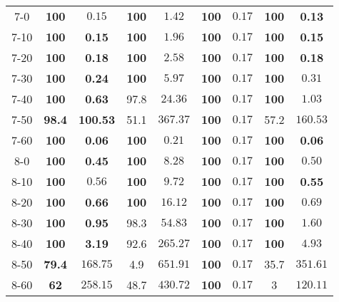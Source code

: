 \documentclass{article}
\begin{document}
\begin{table}[t]
{{\begin{tabular}{c|cc|cc|cc|cc}
            7-0  &  \textbf{100} & $0.15$  &  \textbf{100} & $1.42$  &  \textbf{100} & $0.17$  &  \textbf{100} & \textbf{0.13} \\
            7-10  &  \textbf{100} & \textbf{0.15}  &  \textbf{100} & $1.96$  &  \textbf{100} & $0.17$  &  \textbf{100} & \textbf{0.15} \\
            7-20  &  \textbf{100} & \textbf{0.18}  &  \textbf{100} & $2.58$  &  \textbf{100} & $0.17$  &  \textbf{100} & \textbf{0.18} \\
            7-30  &  \textbf{100} & \textbf{0.24}  &  \textbf{100} & $5.97$  &  \textbf{100} & $0.17$  &  \textbf{100} & $0.31$ \\
            7-40  &  \textbf{100} & \textbf{0.63}  &  97.8 & $24.36$  &  \textbf{100} & $0.17$  &  \textbf{100} & $1.03$ \\
            7-50  &  \textbf{98.4} & \textbf{100.53}  &  51.1 & $367.37$  &  \textbf{100} & $0.17$  &  57.2 & $160.53$ \\
            7-60  &  \textbf{100} & \textbf{0.06}  &  \textbf{100} & $0.21$  &  \textbf{100} & $0.17$  &  \textbf{100} & \textbf{0.06} \\

            8-0  &  \textbf{100} & \textbf{0.45}  &  \textbf{100} & $8.28$  &  \textbf{100} & $0.17$  &  \textbf{100} & $0.50$ \\
            8-10  &  \textbf{100} & $0.56$  &  \textbf{100} & $9.72$  &  \textbf{100} & $0.17$  &  \textbf{100} & \textbf{0.55} \\
            8-20  &  \textbf{100} & \textbf{0.66}  &  \textbf{100} & $16.12$  &  \textbf{100} & $0.17$  &  \textbf{100} & $0.69$ \\
            8-30  &  \textbf{100} & \textbf{0.95}  &  98.3 & $54.83$  &  \textbf{100} & $0.17$  &  \textbf{100} & $1.60$ \\
            8-40  &  \textbf{100} & \textbf{3.19}  &  92.6 & $265.27$  &  \textbf{100} & $0.17$  &  \textbf{100} & $4.93$ \\
            8-50  &  \textbf{79.4} & $168.75$  &  4.9 & $651.91$  &  \textbf{100} & $0.17$  &  35.7 & $351.61$ \\
            8-60  &  \textbf{62} & $258.15$  &  48.7 & $430.72$  &  \textbf{100} & $0.17$  &  3 & $120.11$ \\


\end{tabular}}}
\end{table}
\end{document}
